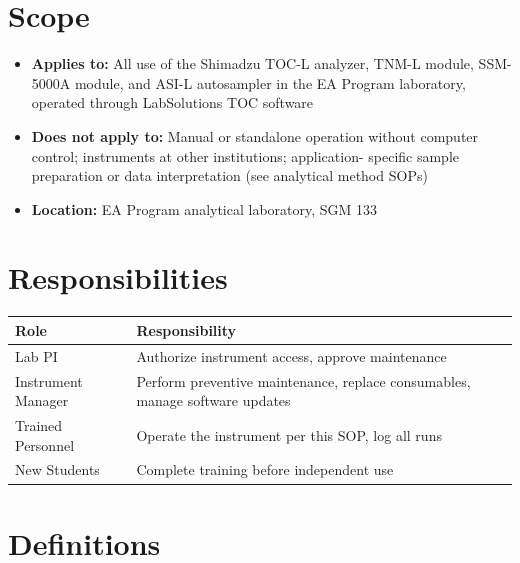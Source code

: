 \documentclass[
  11pt,
  letterpaper,
]{article}
\newcounter{none} %
\providecommand{\tightlist}{%
  \setlength{\itemsep}{0pt}\setlength{\parskip}{0pt}}
\begin{document}
\section{Scope}\label{scope}

\begin{itemize}
\tightlist
\item
  \textbf{Applies to:} All use of the Shimadzu TOC-L analyzer, TNM-L
  module, SSM-5000A module, and ASI-L autosampler in the EA Program
  laboratory, operated through LabSolutions TOC software
\item
  \textbf{Does not apply to:} Manual or standalone operation without
  computer control; instruments at other institutions; application-
  specific sample preparation or data interpretation (see analytical
  method SOPs)
\item
  \textbf{Location:} EA Program analytical laboratory, SGM 133
\end{itemize}

\section{Responsibilities}\label{responsibilities}

{\def\LTcaptype{none} %
\begin{longtable}[]{@{}
  >{\raggedright\arraybackslash}p{}
  >{\raggedright\arraybackslash}p{}@{}}
\toprule\noalign{}
\begin{minipage}[b]{\linewidth}\raggedright
Role
\end{minipage} & \begin{minipage}[b]{\linewidth}\raggedright
Responsibility
\end{minipage} \\
\midrule\noalign{}
\endhead
\bottomrule\noalign{}
\endlastfoot
Lab PI & Authorize instrument access, approve maintenance \\
Instrument Manager & Perform preventive maintenance, replace
consumables, manage software updates \\
Trained Personnel & Operate the instrument per this SOP, log all runs \\
New Students & Complete training before independent use \\
\end{longtable}
}

\section{Definitions}\label{definitions}
\end{document}
